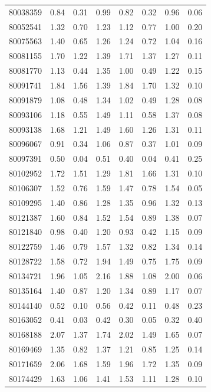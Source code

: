 \begin{small}
\begin{longtable}{|c|c c c|c c c|c|}
80038359 & 0.84 & 0.31 & 0.99 & 0.82 & 0.32 & 0.96 & 0.06 \\
80052541 & 1.32 & 0.70 & 1.23 & 1.12 & 0.77 & 1.00 & 0.20 \\
80075563 & 1.40 & 0.65 & 1.26 & 1.24 & 0.72 & 1.04 & 0.16 \\
80081155 & 1.70 & 1.22 & 1.39 & 1.71 & 1.37 & 1.27 & 0.11 \\
80081770 & 1.13 & 0.44 & 1.35 & 1.00 & 0.49 & 1.22 & 0.15 \\
80091741 & 1.84 & 1.56 & 1.39 & 1.84 & 1.70 & 1.32 & 0.10 \\
80091879 & 1.08 & 0.48 & 1.34 & 1.02 & 0.49 & 1.28 & 0.08 \\
80093106 & 1.18 & 0.55 & 1.49 & 1.11 & 0.58 & 1.37 & 0.08 \\
80093138 & 1.68 & 1.21 & 1.49 & 1.60 & 1.26 & 1.31 & 0.11 \\
80096067 & 0.91 & 0.34 & 1.06 & 0.87 & 0.37 & 1.01 & 0.09 \\
\rowcolor{lightgray}80097391 & 0.50 & 0.04 & 0.51 & 0.40 & 0.04 & 0.41 & 0.25 \\
80102952 & 1.72 & 1.51 & 1.29 & 1.81 & 1.66 & 1.31 & 0.10 \\
80106307 & 1.52 & 0.76 & 1.59 & 1.47 & 0.78 & 1.54 & 0.05 \\
80109295 & 1.40 & 0.86 & 1.28 & 1.35 & 0.96 & 1.32 & 0.13 \\
80121387 & 1.60 & 0.84 & 1.52 & 1.54 & 0.89 & 1.38 & 0.07 \\
80121840 & 0.98 & 0.40 & 1.20 & 0.93 & 0.42 & 1.15 & 0.09 \\
80122759 & 1.46 & 0.79 & 1.57 & 1.32 & 0.82 & 1.34 & 0.14 \\
80128722 & 1.58 & 0.72 & 1.94 & 1.49 & 0.75 & 1.75 & 0.09 \\
80134721 & 1.96 & 1.05 & 2.16 & 1.88 & 1.08 & 2.00 & 0.06 \\
80135164 & 1.40 & 0.87 & 1.20 & 1.34 & 0.89 & 1.17 & 0.07 \\
\rowcolor{lightgray}80144140 & 0.52 & 0.10 & 0.56 & 0.42 & 0.11 & 0.48 & 0.23 \\
\rowcolor{lightgray}80163052 & 0.41 & 0.03 & 0.42 & 0.30 & 0.05 & 0.32 & 0.40 \\
80168188 & 2.07 & 1.37 & 1.74 & 2.02 & 1.49 & 1.65 & 0.07 \\
80169469 & 1.35 & 0.82 & 1.37 & 1.21 & 0.85 & 1.25 & 0.14 \\
80171659 & 2.06 & 1.68 & 1.59 & 1.96 & 1.72 & 1.35 & 0.09 \\
80174429 & 1.63 & 1.06 & 1.41 & 1.53 & 1.11 & 1.28 & 0.10 \\

\end{longtable}
\end{small}
